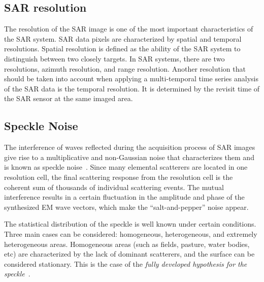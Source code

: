 \subsection{SAR resolution}
The resolution of the SAR image is one of the most important characteristics of the SAR system. 
SAR data pixels are characterized by spatial and temporal resolutions. Spatial resolution is defined as the ability of the SAR system to distinguish between two closely targets.
In SAR systems, there are two resolutions, azimuth resolution, and range resolution. 
Another resolution that should be taken into account when applying a multi-temporal time series analysis of the SAR data is the temporal resolution. 
It is determined by the revisit time of the SAR sensor at the same imaged area.


\subsection{Speckle Noise}
 
The interference of waves reflected during the acquisition process of SAR  images give rise to a multiplicative and non-Gaussian noise that characterizes them
and is known as speckle noise~\citep{oliver2004understanding}.
Since many elemental scatterers are located in one resolution cell, the final scattering response from the resolution cell is the coherent sum of thousands of individual scattering events.
The mutual interference results in a certain fluctuation in the amplitude and phase of the synthesized EM wave vectors, which make the “salt-and-pepper” noise  appear. 


The statistical distribution of the speckle is well known under certain conditions. Three main cases can be considered:
homogeneous, heterogeneous, and extremely heterogeneous areas. Homogeneous areas (such as fields, pasture, water bodies, etc)
are characterized by the lack of dominant scatterers, and the surface  can be considered stationary. This is the case of the
\textit{fully developed hypothesis for the speckle}~\citep{Frery1997}.

